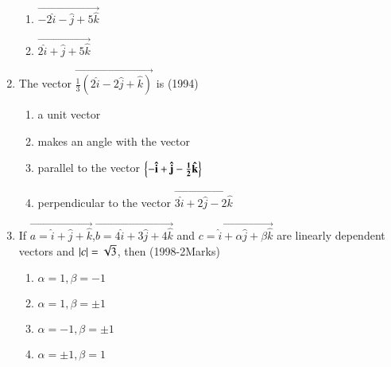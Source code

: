 \documentclass[journal,12pt,twocolumn]{IEEEtran}
\theoremstyle{remark}
\begin{document}
\begin{enumerate}
\begin{enumerate}
			\item $\vec{-2\hat{i}-\hat{j}+5\hat{k}}$
			\item $\vec{2\hat{i}+\hat{j}+5\hat{k}}$
		\end{enumerate}
\item %
	The vector $\vec{\frac{1}{3}(2\hat{i}-2\hat{j}+\hat{k})}$ is \hfill{(1994)}\\
		\begin{enumerate}
			\item a unit vector
			\item makes an angle with the vector
			\item parallel to the vector $\mathbf{\left\{-\hat{i}+\hat{j}-\frac{1}{2}\hat{k}\right\}}$
			\item perpendicular to the vector $\vec{3\hat{i}+2\hat{j}-2\hat{k}}$
                \end{enumerate}
\item %
	If $\vec{a=\hat{i}+\hat{j}+\hat{k}}$,$\vec{b=4\hat{i}+3\hat{j}+4\hat{k}}$ and $\vec{c=\hat{i}+\alpha\hat{j}+\beta\hat{k}}$ are linearly dependent vectors and $\left\vert c\right\vert=\sqrt{3}$, then \hfill{(1998-2Marks)}\\
		\begin{enumerate}
			\item $\alpha=1,\beta=-1$
			\item $\alpha=1,\beta=\pm1$
			\item $\alpha=-1,\beta=\pm1$
			\item $\alpha=\pm1,\beta=1$
		\end{enumerate}
\end{enumerate}
\end{document}
